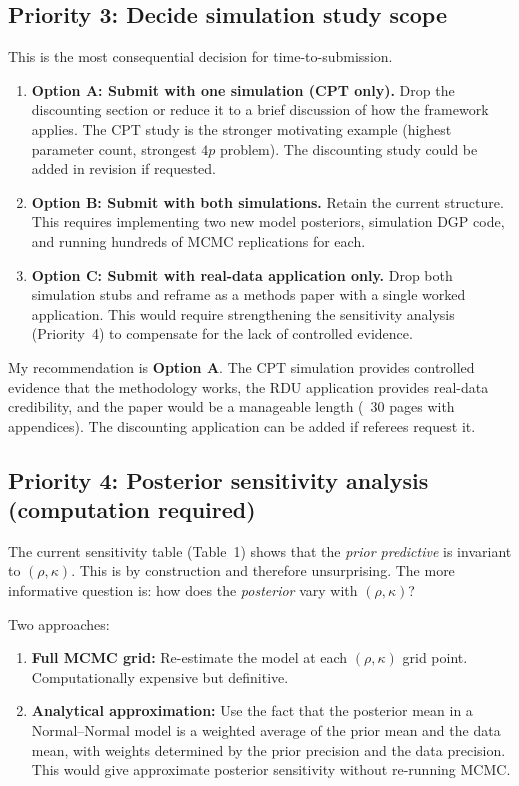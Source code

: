 \documentclass[12pt,a4paper]{article}
\begin{document}
\subsection{Priority 3: Decide simulation study scope}

This is the most consequential decision for time-to-submission.

\begin{enumerate}
  \item \textbf{Option A: Submit with one simulation (CPT only).} Drop the
    discounting section or reduce it to a brief discussion of how the framework
    applies. The CPT study is the stronger motivating example (highest
    parameter count, strongest $4p$ problem). The discounting study could be
    added in revision if requested.
  \item \textbf{Option B: Submit with both simulations.} Retain the current
    structure. This requires implementing two new model posteriors, simulation
    DGP code, and running hundreds of MCMC replications for each.
  \item \textbf{Option C: Submit with real-data application only.} Drop both
    simulation stubs and reframe as a methods paper with a single worked
    application. This would require strengthening the sensitivity analysis
    (Priority~4) to compensate for the lack of controlled evidence.
\end{enumerate}

My recommendation is \textbf{Option A}. The CPT simulation provides controlled
evidence that the methodology works, the RDU application provides real-data
credibility, and the paper would be a manageable length (~30 pages with
appendices). The discounting application can be added if referees request it.

\subsection{Priority 4: Posterior sensitivity analysis (computation required)}

The current sensitivity table (Table~1) shows that the \emph{prior predictive}
is invariant to $(\rho, \kappa)$. This is by construction and therefore
unsurprising. The more informative question is: how does the \emph{posterior}
vary with $(\rho, \kappa)$?

Two approaches:

\begin{enumerate}
  \item \textbf{Full MCMC grid:} Re-estimate the model at each $(\rho,
    \kappa)$ grid point. Computationally expensive but definitive.
  \item \textbf{Analytical approximation:} Use the fact that the posterior mean
    in a Normal--Normal model is a weighted average of the prior mean and the
    data mean, with weights determined by the prior precision and the data
    precision. This would give approximate posterior sensitivity without
    re-running MCMC.
\end{enumerate}
\end{document}
